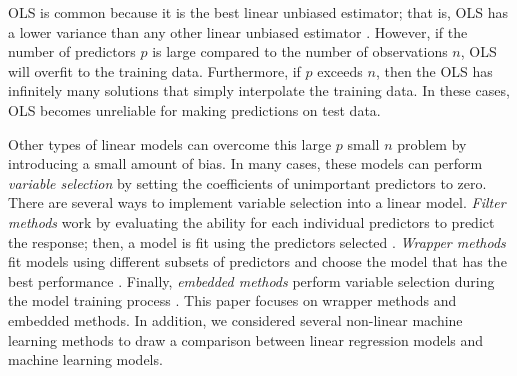 \documentclass[final,onefignum,onetabnum]{siuro210301}
\begin{document}

	
	OLS is common because it is the best linear unbiased estimator; that is, OLS has a lower variance than any other linear unbiased estimator \cite{greene2003econometric, friedman2001elements}. However, if the number of predictors $p$ is large compared to the number of observations $n$, OLS will overfit to the training data. Furthermore, if $p$ exceeds $n$, then the OLS has infinitely many solutions that simply interpolate the training data. In these cases, OLS becomes unreliable for making predictions on test data.
	
	Other types of linear models can overcome this large $p$ small $n$ problem by introducing a small amount of bias. In many cases, these models can perform \textit{variable selection} by setting the coefficients of unimportant predictors to zero. There are several ways to implement variable selection into a linear model. \textit{Filter methods} work by evaluating the ability for each individual predictors to predict the response; then, a model is fit using the predictors selected \cite{sanchez2007filter, ding2005minimum}. \textit{Wrapper methods} fit models using different subsets of predictors and choose the model that has the best performance \cite{guyon2003introduction, liu2020logsum}. Finally, \textit{embedded methods} perform variable selection during the model training process \cite{guyon2003introduction, liu2020logsum}. This paper focuses on wrapper methods and embedded methods. In addition, we considered several non-linear machine learning methods to draw a comparison between linear regression models and machine learning models.
	
\end{document}
